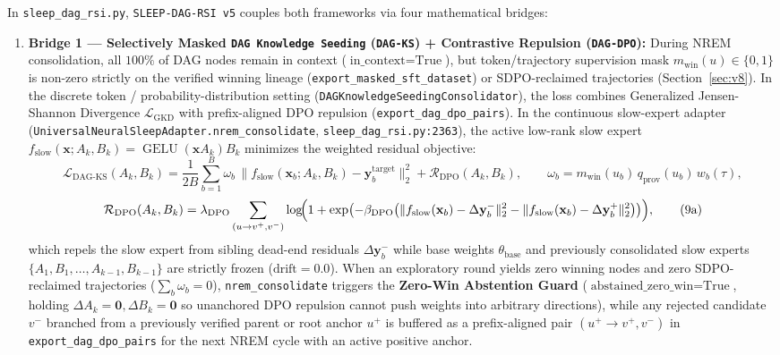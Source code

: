 \documentclass[11pt,a4paper]{article}
\begin{document}
In \texttt{sleep\_dag\_rsi.py}, \texttt{SLEEP-DAG-RSI v5} couples both frameworks via four mathematical bridges:
\begin{enumerate}
\item \textbf{Bridge 1 --- Selectively Masked \texttt{DAG Knowledge Seeding} (\texttt{DAG-KS}) + Contrastive Repulsion (\texttt{DAG-DPO}):}
During NREM consolidation, all $100\%$ of DAG nodes remain in context ($\text{in\_context} = \text{True}$), but token/trajectory supervision mask $m_{\text{win}}(u) \in \{0, 1\}$ is non-zero strictly on the verified winning lineage (\texttt{export\_masked\_sft\_dataset}) or SDPO-reclaimed trajectories (Section~\ref{sec:v8}). In the discrete token / probability-distribution setting (\texttt{DAGKnowledgeSeedingConsolidator}), the loss combines Generalized Jensen-Shannon Divergence $\mathcal{L}_{\text{GKD}}$ \cite{sleep2026} with prefix-aligned DPO repulsion (\texttt{export\_dag\_dpo\_pairs}). In the continuous slow-expert adapter (\texttt{UniversalNeuralSleepAdapter.nrem\_consolidate}, \texttt{sleep\_dag\_rsi.py:2363}), the active low-rank slow expert $f_{\text{slow}}(\mathbf{x}; A_k, B_k) = \operatorname{GELU}(\mathbf{x} A_k) B_k$ minimizes the weighted residual objective:
\begin{equation}
\mathcal{L}_{\text{DAG-KS}}(A_k, B_k) = \frac{1}{2B}\sum_{b=1}^B \omega_b \,\bigl\|f_{\text{slow}}(\mathbf{x}_b; A_k, B_k) - \mathbf{y}_b^{\text{target}}\bigr\|_2^2 + \mathcal{R}_{\text{DPO}}(A_k, B_k), \qquad \omega_b = m_{\text{win}}(u_b)\,q_{\text{prov}}(u_b)\,w_b(\tau),
\tag{9}\label{eq:dag_ks}
\end{equation}
\begin{equation}
\mathcal{R}_{\text{DPO}}(A_k, B_k) = \lambda_{\text{DPO}}\sum_{(u \to v^+, v^-)} \log\!\Bigl(1 + \exp\bigl(-\beta_{\text{DPO}}\bigl(\|f_{\text{slow}}(\mathbf{x}_b) - \Delta\mathbf{y}_b^-\|_2^2 - \|f_{\text{slow}}(\mathbf{x}_b) - \Delta\mathbf{y}_b^+\|_2^2\bigr)\bigr)\Bigr),
\tag{9a}\label{eq:dag_dpo}
\end{equation}
which repels the slow expert from sibling dead-end residuals $\Delta\mathbf{y}_b^-$ while base weights $\theta_{\text{base}}$ and previously consolidated slow experts $\{A_1, B_1, \dots, A_{k-1}, B_{k-1}\}$ are strictly frozen ($\text{drift} = 0.0$). When an exploratory round yields zero winning nodes and zero SDPO-reclaimed trajectories ($\sum_b \omega_b = 0$), \texttt{nrem\_consolidate} triggers the \textbf{Zero-Win Abstention Guard} ($\text{abstained\_zero\_win} = \text{True}$, holding $\Delta A_k = \mathbf{0}, \Delta B_k = \mathbf{0}$ so unanchored DPO repulsion cannot push weights into arbitrary directions), while any rejected candidate $v^-$ branched from a previously verified parent or root anchor $u^+$ is buffered as a prefix-aligned pair $(u^+ \to v^+, v^-)$ in \texttt{export\_dag\_dpo\_pairs} for the next NREM cycle with an active positive anchor.

\end{enumerate}
\end{document}
